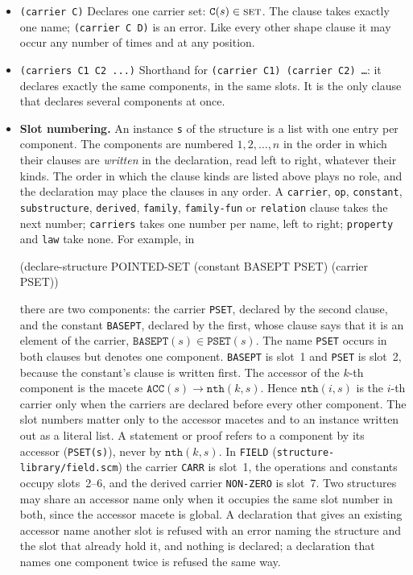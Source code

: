 \begin{itemize}

\item \texttt{(carrier C)}
  Declares one carrier set: $\mathtt{C}(s) \in \textsc{set}$.  The clause
  takes exactly one name; \texttt{(carrier C D)} is an error.  Like every
  other shape clause it may occur any number of times and at any position.

\item \texttt{(carriers C1 C2 ...)}
  Shorthand for \texttt{(carrier C1) (carrier C2) \ldots}: it declares
  exactly the same components, in the same slots.  It is the only clause that
  declares several components at once.

\item \textbf{Slot numbering.}  An instance \texttt{s} of the structure is a
  list with one entry per component.  The components are numbered
  $1, 2, \ldots, n$ in the order in which their clauses are \emph{written} in
  the declaration, read left to right, whatever their kinds.  The order in which
  the clause kinds are listed above plays no role, and the declaration may
  place the clauses in any order.  A \texttt{carrier}, \texttt{op},
  \texttt{constant}, \texttt{substructure}, \texttt{derived}, \texttt{family},
  \texttt{family-fun} or \texttt{relation} clause takes the next number;
  \texttt{carriers} takes one number per name, left to right;
  \texttt{property} and \texttt{law} take none.  For example, in
\begin{VNBcode}
(declare-structure POINTED-SET
  (constant BASEPT PSET)
  (carrier PSET))
\end{VNBcode}
  there are two components: the carrier \texttt{PSET}, declared by the second
  clause, and the constant \texttt{BASEPT}, declared by the first, whose clause
  says that it is an element of the carrier, $\mathtt{BASEPT}(s) \in
  \mathtt{PSET}(s)$.  The name \texttt{PSET} occurs in both clauses but denotes
  one component.  \texttt{BASEPT} is slot~1 and \texttt{PSET} is slot~2,
  because the constant's clause is written first.  The accessor of the
  $k$-th component is the macete $\mathtt{ACC}(s) \to \mathtt{nth}(k, s)$.
  Hence $\mathtt{nth}(i, s)$ is the $i$-th carrier only when the carriers
  are declared before every other component.  The slot numbers matter only to
  the accessor macetes and to an instance written out as a literal list.  A
  statement or proof refers to a component by its accessor
  (\texttt{PSET(s)}), never by $\mathtt{nth}(k, s)$.  In \texttt{FIELD}
  (\texttt{structure-library/field.scm}) the carrier \texttt{CARR} is slot~1,
  the operations and constants occupy slots~2--6, and the derived carrier
  \texttt{NON-ZERO} is slot~7.  Two structures may share an accessor name only
  when it occupies the same slot number in both, since the accessor macete is
  global.  A declaration that gives an existing accessor name another slot is
  refused with an error naming the structure and the slot that already hold it,
  and nothing is declared; a declaration that names one component twice is
  refused the same way.


\end{itemize}
